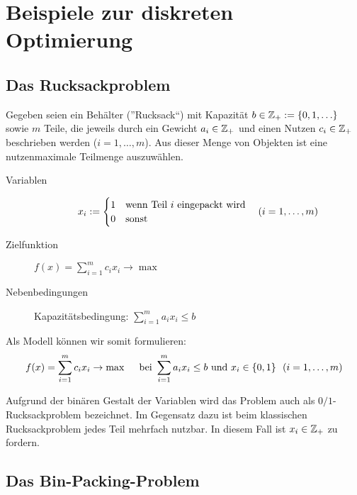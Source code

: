 \section{Beispiele zur diskreten Optimierung}

\subsection{Das Rucksackproblem}

Gegeben seien ein Behälter (''Rucksack``) mit Kapazität $b \in \Z_+ \defeq \menge{0, 1, \dots}$ sowie $m$ Teile, die jeweils durch ein Gewicht $a_i \in \mathbb{Z}_+$ und einen Nutzen $c_i \in \mathbb{Z}_+$ beschrieben werden ($i = 1, \dots , m$). Aus dieser Menge von Objekten ist eine nutzenmaximale Teilmenge auszuwählen.


\begin{description}
	\item[Variablen] \begin{equation*}
		x_i \mathrel{:=} \begin{cases}
		1 & \text{wenn Teil $i$ eingepackt wird} \\ 0 & \text{sonst}
		\end{cases} \quad (i = 1, \dots , m)
	\end{equation*}
	\item[Zielfunktion] $f(x) = \sum\limits_{i=1}^{m} c_i x_i \to \max$
	\item[Nebenbedingungen] Kapazitätsbedingung: $\sum\limits_{i=1}^{m} a_i x_i \le b$
\end{description}

Als Modell können wir somit formulieren:
\begin{equation*}
	\begin{aligned}
	f(x) = \sum_{i=1}^{m} c_i x_i \to \max \quad \text{ bei } \sum_{i=1}^m a_i x_i \le b \text{ und } x_i \in \left\{ 0,1 \right\} \enskip (i = 1, \dots , m)
	\end{aligned}
\end{equation*}

Aufgrund der binären Gestalt der Variablen wird das Problem auch als $0/1$-Rucksackproblem bezeichnet. Im Gegensatz dazu ist beim klassischen Rucksackproblem jedes Teil mehrfach nutzbar. In diesem Fall ist $x_i \in \mathbb{Z}_+$ zu fordern.

\subsection{Das Bin-Packing-Problem}
\label{subsec: 1.3.2}

